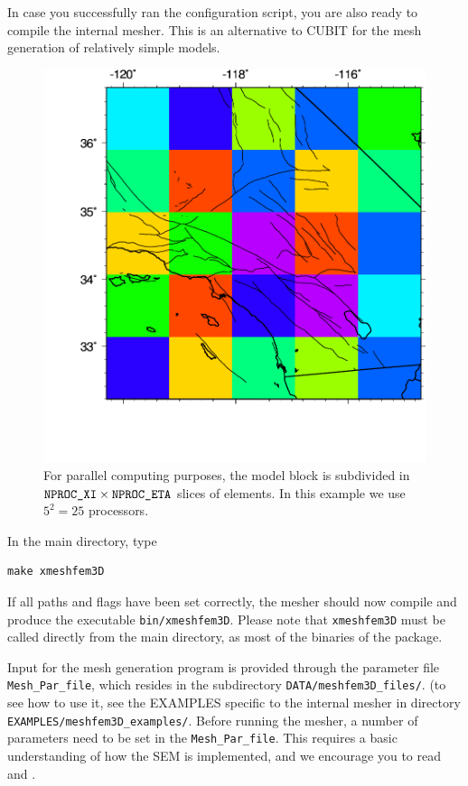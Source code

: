 In case you successfully ran the configuration script, you are also
ready to compile the internal mesher. This is an alternative to CUBIT
for the mesh generation of relatively simple models.
%
\begin{figure}[htbp]
\begin{centering}
\includegraphics[scale=0.5]{figures/socal_map_mpi.pdf}
\par
\end{centering}
\caption{For parallel computing purposes,
the model block is subdivided in $\mbox{\texttt{NPROC\_XI\/}}\times\mbox{\texttt{NPROC\_ETA\/}}$ slices
of elements. In this example we use $5^{2}=25$ processors. }
\label{fig:For-parallel-computing}
\end{figure}


\noindent
In the main directory, type
{\small
\begin{verbatim}
make xmeshfem3D
\end{verbatim}
}
\noindent
If all paths and flags have been set correctly, the mesher should
now compile and produce the executable \texttt{bin/xmeshfem3D}. Please
note that \texttt{xmeshfem3D} must be called directly from the main
directory, as most of the binaries of the package.

Input for the mesh generation program is provided through the parameter
file \texttt{Mesh\_Par\_file}, which resides in the subdirectory \texttt{DATA/meshfem3D\_files/}.
(to see how to use it, see the EXAMPLES specific to the internal mesher in directory \texttt{EXAMPLES/meshfem3D\_examples/}.
Before running the mesher, a number of parameters need to be set in
the \texttt{Mesh\_Par\_file}. This requires a basic understanding
of how the SEM is implemented, and we encourage you to read \citet{KoVi98,KoTr99}
and \citet{KoLiTrSuStSh04}.

